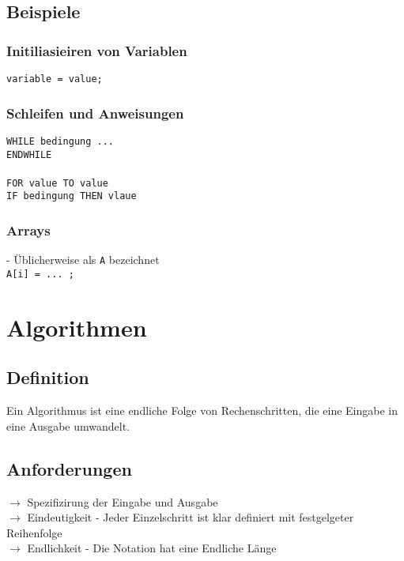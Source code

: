 	\subsection{Beispiele}
	\subsubsection{Initiliasieiren von Variablen}
	\texttt{variable = value;}

	\subsubsection{Schleifen und Anweisungen}
	\texttt{WHILE bedingung ...} \\
	\hspace{0.4cm} \texttt{ENDWHILE} \\ \\
	\texttt{FOR value TO value} \\
	\texttt{IF bedingung THEN vlaue} \\

	\subsubsection{Arrays}
	- Üblicherweise als \texttt{A} bezeichnet \\
	\texttt{A[i] = ... ;}



\vspace{1.5cm}
\section{Algorithmen} %

\subsection{Definition}
	Ein Algorithmus ist eine endliche Folge von Rechenschritten, die eine Eingabe in eine Ausgabe umwandelt.

	\subsection{Anforderungen}
	$\rightarrow$ Spezifizirung der Eingabe und Ausgabe \\
	$\rightarrow$ Eindeutigkeit - Jeder Einzelschritt ist klar definiert mit festgelgeter Reihenfolge \\
	$\rightarrow$ Endlichkeit - Die Notation hat eine Endliche Länge

